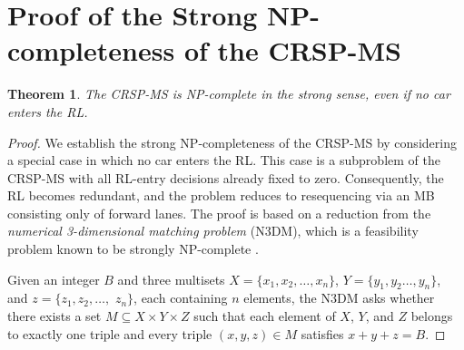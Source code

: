 \documentclass[12pt]{article}
\newtheorem{theorem}{Theorem}
\begin{document}
\appendix

\section{Proof of the Strong NP-completeness of the CRSP-MS}
\begin{theorem}\label{app-theo1}
    The CRSP-MS is NP-complete in the strong sense, even if no car enters the RL.
\end{theorem}
\begin{proof}

    We establish the strong NP-completeness of the CRSP-MS by considering a special case in which no car enters the RL. This case is a subproblem of the CRSP-MS with all RL-entry decisions already fixed to zero. Consequently, the RL becomes redundant, and the problem reduces to resequencing via an MB consisting only of forward lanes. The proof is based on a reduction from the \textit{numerical 3-dimensional matching problem} (N3DM), which is a feasibility problem known to be strongly NP-complete \citep{garey2002computers}.


    Given an integer $B$ and three multisets $X=\{x_1,x_2,\dots,x_n\}$, $Y=\{y_1,y_2\dots,y_n\}$, and $z=\{z_1,z_2,\dots,$ $z_n\}$, each containing $n$ elements, the N3DM asks whether there exists a set $M\subseteq X\times Y\times Z$ such that each element of $X$, $Y$, and $Z$ belongs to exactly one triple and every triple $(x,y,z)\in M$ satisfies $x+y+z=B$.



\end{proof}
\end{document}
